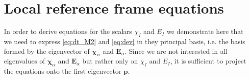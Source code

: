 


\section{Local reference frame equations}

In order to derive equations for the scalars $\chi_I$ and $E_I$ we demonstrate here that we need to express \ref{eq:dt_M2} and \ref{eq:dev} in they principal basis, i.e. the basis formed by the eigenvector of $\bm\chi_\alpha$ and $\textbf{E}_\alpha$. 
Since we are not interested in all eigenvalues of $\bm\chi_\alpha$ and $\textbf{E}_\alpha$ but rather only on $\chi_I$ and $E_I$, it is sufficient to project the equations onto the first eigenvector $\textbf{p}$. 

